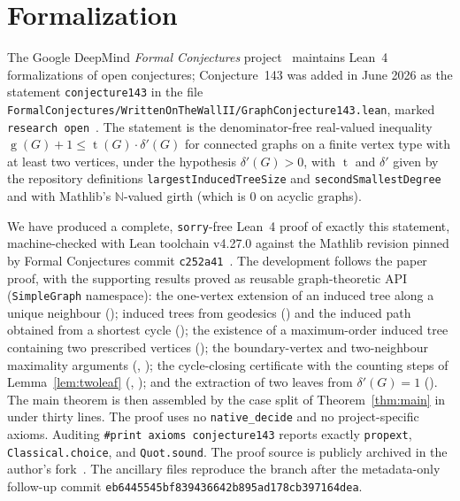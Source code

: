 \documentclass[11pt]{article}
\numberwithin{equation}{section}
\theoremstyle{remark}
\newcommand{\tr}{\operatorname{t}}
\newcommand{\gr}{\operatorname{g}}
\newcommand{\dd}{\delta'}
\begin{document}
\section{Formalization}\label{sec:formal}

The Google DeepMind \emph{Formal Conjectures} project~\cite{FC,FCPaper} maintains
Lean~4 formalizations of open conjectures; Conjecture~143 was added in June
2026 as the statement \texttt{conjecture143} in the file
\texttt{FormalConjectures/WrittenOnTheWallII/GraphConjecture143.lean},
marked \texttt{research open}~\cite{FC143}.  The statement is the
denominator-free real-valued inequality
$\gr(G)+1\le\tr(G)\cdot\dd(G)$ for connected graphs on a finite
vertex type with at least two vertices, under the hypothesis $\dd(G)>0$, with
$\tr$ and $\dd$ given by the repository definitions
\texttt{largestInducedTreeSize} and \texttt{secondSmallestDegree} and with
Mathlib's $\mathbb{N}$-valued girth (which is $0$ on acyclic graphs).

\begin{sloppypar}
We have produced a complete, \texttt{sorry}-free Lean~4 proof of exactly this
statement, machine-checked with Lean toolchain v4.27.0 against the Mathlib
revision pinned by Formal Conjectures commit \texttt{c252a41}~\cite{mathlib}.
The development follows the paper proof, with the
supporting results proved as reusable graph-theoretic API
(\texttt{SimpleGraph} namespace): the one-vertex extension of an induced tree
along a unique neighbour ();
induced trees from geodesics
() and the induced
path obtained from a shortest cycle
(); the existence of a
maximum-order induced tree containing two prescribed vertices
(); the boundary-vertex and
two-neighbour maximality arguments
(,
); the
cycle-closing certificate with the counting steps of Lemma~\ref{lem:twoleaf}
(,
); and the
extraction of two leaves from $\dd(G)=1$
().
The main theorem is then assembled by the case split of
Theorem~\ref{thm:main} in under thirty lines.  The proof uses no
\texttt{native\_decide} and no project-specific axioms.  Auditing
\texttt{\#print axioms conjecture143} reports exactly \texttt{propext},
\texttt{Classical.choice}, and \texttt{Quot.sound}.  The proof source is
publicly archived in the author's fork~\cite{OurLean}.  The ancillary files
reproduce the branch after the metadata-only follow-up commit
\texttt{eb6445545bf839436642b895ad178cb397164dea}.
\end{sloppypar}
\end{document}
